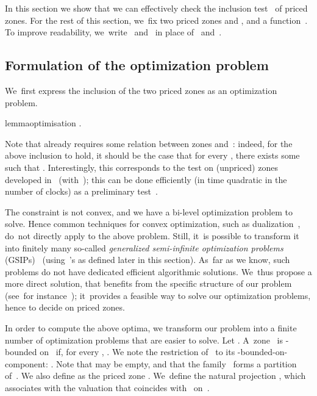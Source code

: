 In this section we show that we can effectively check the inclusion
test~ of priced zones. For the rest of this section, we~fix two
priced zones  and , and a
function~. To improve readability, we~write~ and~ in place
of~ and~.
\subsection{Formulation of the optimization problem}
\label{subsec:opt}

We~first express the inclusion of the two priced zones as an
optimization problem.

\begin{restatable}{lemma}{optimisation}
  \label{lemma:inclusion_sup}
  .
\end{restatable}


Note that  already requires some
relation between zones  and~: indeed, for the above inclusion
to hold, it should be the case that for every , there exists
some  such that .  Interestingly, this
corresponds to the test on (unpriced) zones developed in~\cite{HSW12}
(with~); this can be done efficiently (in time quadratic in the
number of clocks) as a preliminary test~\cite[Theorem 34]{HSW12}.

\begin{remark}
  The constraint  is not convex, and we have a bi-level
  optimization problem to solve.
  Hence common techniques for convex optimization, such as
  dualization~\cite{BV04}, do~not directly apply to the above
  problem. Still, it~is possible to transform it into finitely many
  so-called \emph{generalized semi-infinite optimization problems}
  (GSIPs)~\cite{RS01} (using~'s as defined later in this
  section).  As~far as we know, such problems do not have dedicated
  efficient algorithmic solutions. We~thus propose a more direct
  solution, that benefits from the specific structure of our problem
  (see~for instance~); it~provides a feasible way to
  solve our optimization problems, hence to decide  on
  priced zones.
\end{remark}

In order to compute the above optima, we transform our problem into a
finite number of optimization problems that are easier to solve.
Let .  A~zone~ is -bounded on~ if, for every
, .  We note  the
restriction of~ to its -bounded-on- component:
.  Note that  may be empty, and that the
family~ forms a partition of~. We also define
 as the priced zone . We~define the
natural projection ,
which associates with  the valuation  that coincides with~ on~.



